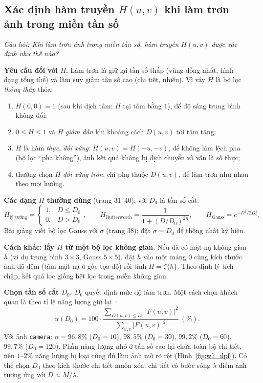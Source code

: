\subsection{Xác định hàm truyền \texorpdfstring{$H(u, v)$}{H(u, v)} khi làm trơn ảnh trong miền tần số}
\label{subsec:w7_find_H}

\textit{Câu hỏi: Khi làm trơn ảnh trong miền tần số, hàm truyền $H(u, v)$ được xác định như thế nào?}

\textbf{Yêu cầu đối với $H$.} Làm trơn là giữ lại tần số thấp (vùng đồng nhất, hình dạng tổng thể) và làm suy giảm tần số cao (chi tiết, nhiễu). Vì vậy $H$ là bộ lọc \emph{thông thấp} thỏa:
\begin{enumerate}
    \item $H(0, 0) = 1$ (sau khi dịch tâm: $H$ tại tâm bằng $1$), để độ sáng trung bình không đổi;
    \item $0 \le H \le 1$ và $H$ \emph{giảm dần} khi khoảng cách $D(u, v)$ tới tâm tăng;
    \item $H$ là hàm \emph{thực}, \emph{đối xứng}: $H(u, v) = H(-u, -v)$, để không làm lệch pha (bộ lọc ``pha không''), ảnh kết quả không bị dịch chuyển và vẫn là số thực;
    \item thường chọn $H$ \emph{đối xứng tròn}, chỉ phụ thuộc $D(u, v)$, để làm trơn như nhau theo mọi hướng.
\end{enumerate}

\textbf{Các dạng $H$ thường dùng} (trang 31--40), với $D_0$ là tần số cắt:
\begin{equation}
H_{\text{lý tưởng}} = \begin{cases} 1, & D \le D_0 \\ 0, & D > D_0 \end{cases}, \qquad
H_{\text{Butterworth}} = \frac{1}{1 + (D/D_0)^{2n}}, \qquad
H_{\text{Gauss}} = e^{-D^2/2D_0^2}.
\end{equation}
Bài giảng viết bộ lọc Gauss với $\sigma$ (trang 38); đặt $\sigma = D_0$ để thống nhất ký hiệu.

\textbf{Cách khác: lấy $H$ từ một bộ lọc không gian.} Nếu đã có mặt nạ không gian $h$ (ví dụ trung bình $3 \times 3$, Gauss $5 \times 5$), đặt $h$ vào một mảng $0$ cùng kích thước ảnh đã đệm (tâm mặt nạ ở gốc tọa độ) rồi tính $H = \zeta\{h\}$. Theo định lý tích chập, kết quả lọc giống hệt lọc trong miền không gian.

\textbf{Chọn tần số cắt $D_0$.} $D_0$ quyết định mức độ làm trơn. Một cách chọn khách quan là theo tỉ lệ năng lượng giữ lại~\citep{gonzalez2018digital}:
\begin{equation}
\alpha(D_0) = 100 \cdot \frac{\sum_{D(u, v) \le D_0} |F(u, v)|^2}{\sum_{u, v}|F(u, v)|^2}\ (\%).
\end{equation}
Với ảnh \texttt{camera}: $\alpha = 96{,}8\%$ ($D_0 = 10$), $98{,}5\%$ ($D_0 = 30$), $99{,}2\%$ ($D_0 = 60$), $99{,}7\%$ ($D_0 = 120$). Phần năng lượng nhỏ ở tần số cao lại chứa toàn bộ chi tiết, nên $1$--$2\%$ năng lượng bị loại cũng đủ làm ảnh mờ rõ rệt (Hình~\ref{fig:w7_ilpf}). Có thể chọn $D_0$ theo kích thước chi tiết muốn xóa: chi tiết có bước sóng $\lambda$ điểm ảnh tương ứng với $D \approx M/\lambda$.

